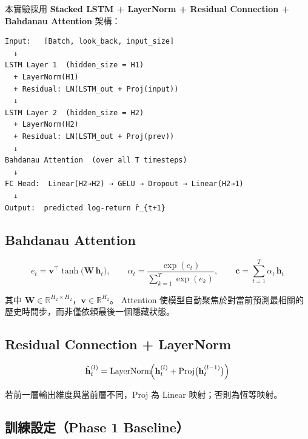 \documentclass[12pt,a4paper]{article}
\begin{document}
本實驗採用 \textbf{Stacked LSTM + LayerNorm + Residual Connection + Bahdanau Attention} 架構：

\begin{tcolorbox}[colback=codegray, colframe=gray!50, title=Model Architecture]
\begin{lstlisting}
Input:   [Batch, look_back, input_size]
  ↓
LSTM Layer 1  (hidden_size = H1)
  + LayerNorm(H1)
  + Residual: LN(LSTM_out + Proj(input))
  ↓
LSTM Layer 2  (hidden_size = H2)
  + LayerNorm(H2)
  + Residual: LN(LSTM_out + Proj(prev))
  ↓
Bahdanau Attention  (over all T timesteps)
  ↓
FC Head:  Linear(H2→H2) → GELU → Dropout → Linear(H2→1)
  ↓
Output:  predicted log-return r̂_{t+1}
\end{lstlisting}
\end{tcolorbox}

\subsection{Bahdanau Attention}

\begin{equation}
  e_t = \mathbf{v}^\top \tanh\!\bigl(\mathbf{W}\,\mathbf{h}_t\bigr), \qquad
  \alpha_t = \frac{\exp(e_t)}{\sum_{k=1}^{T}\exp(e_k)}, \qquad
  \mathbf{c} = \sum_{t=1}^{T} \alpha_t\,\mathbf{h}_t
\end{equation}

其中 $\mathbf{W}\!\in\!\mathbb{R}^{H_2\times H_2}$，$\mathbf{v}\!\in\!\mathbb{R}^{H_2}$。
Attention 使模型自動聚焦於對當前預測最相關的歷史時間步，而非僅依賴最後一個隱藏狀態。

\subsection{Residual Connection + LayerNorm}

\begin{equation}
  \tilde{\mathbf{h}}_t^{(l)} = \text{LayerNorm}\!\Bigl(\mathbf{h}_t^{(l)} + \text{Proj}\bigl(\mathbf{h}_t^{(l-1)}\bigr)\Bigr)
\end{equation}

若前一層輸出維度與當前層不同，$\text{Proj}$ 為 Linear 映射；否則為恆等映射。

\subsection{訓練設定（Phase 1 Baseline）}
\end{document}
